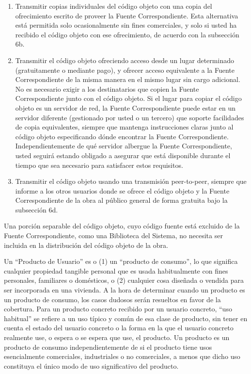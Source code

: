 {\begin{enumerate}
\begin{enumerate}
  \item Transmitir copias individuales del c\'{o}digo objeto con una copia 
    del ofrecimiento escrito de proveer la Fuente Correspondiente.  Esta 
    alternativa est\'{a} permitida solo ocasionalmente sin fines comerciales, 
    y solo si usted ha recibido el c\'{o}digo objeto con ese ofrecimiento, 
    de acuerdo con la subsecci\'{o}n 6b.

  \item Transmitir el c\'{o}digo objeto ofreciendo acceso desde un lugar 
    determinado (gratuitamente o mediante pago), y ofrecer acceso 
    equivalente a la Fuente Correspondiente de la misma manera en el 
    mismo lugar sin cargo adicional. No es necesario exigir a los 
    destinatarios que copien la Fuente Correspondiente junto con el 
    c\'{o}digo objeto.  Si el lugar para copiar el c\'{o}digo objeto es un 
    servidor de red, la Fuente Correspondiente puede estar en un 
    servidor diferente (gestionado por usted o un tercero) que soporte 
    facilidades de copia equivalentes, siempre que mantenga 
    instrucciones claras junto al c\'{o}digo objeto especificando d\'{o}nde 
    encontrar la Fuente Correspondiente. Independientemente de qu\'{e} 
    servidor albergue la Fuente Correspondiente, usted seguir\'{a} estando 
    obligado a asegurar que est\'{a} disponible durante el tiempo que 
    sea necesario para satisfacer estos requisitos.

  \item Transmitir el c\'{o}digo objeto usando una transmisi\'{o}n peer-to-peer, 
    siempre que informe a los otros usuarios donde se ofrece el c\'{o}digo 
    objeto y la Fuente Correspondiente de la obra al p\'{u}blico general de 
    forma gratuita bajo la subsecci\'{o}n 6d.
  \end{enumerate}

Una porci\'{o}n separable del c\'{o}digo objeto, cuyo c\'{o}digo fuente est\'{a} 
excluido de la Fuente Correspondiente, como una Biblioteca del Sistema, 
no necesita ser incluida en la distribuci\'{o}n del c\'{o}digo objeto de la obra.

Un ``Producto de Usuario'' es o (1) un ``producto de consumo'', lo que 
significa cualquier propiedad tangible personal que es usada 
habitualmente con fines personales, familiares o dom\'{e}sticos, o (2) 
cualquier cosa dise\~nada o vendida para ser incorporada en una vivienda.  
A la hora de determinar cuando un producto es un producto de consumo, 
los casos dudosos ser\'{a}n resueltos en favor de la cobertura.  Para un 
producto concreto recibido por un usuario concreto, ``uso habitual'' se 
refiere a un uso t\'{i}pico y com\'{u}n de esa clase de producto, sin tener en 
cuenta el estado del usuario concreto o la forma en la que el usuario 
concreto realmente use, o espera o se espera que use, el producto.  Un 
producto es un producto de consumo independientemente de si el producto 
tiene usos esencialmente comerciales, industriales o no comerciales, a 
menos que dicho uso constituya el \'{u}nico modo de uso significativo del 
producto.


\end{enumerate}}
